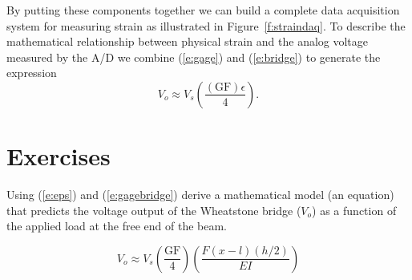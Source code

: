 By putting these components together we can build a complete data acquisition system for measuring strain as illustrated in Figure~\ref{f:straindaq}. To describe the mathematical relationship between physical strain and the analog voltage measured by the A/D we combine (\ref{e:gage}) and (\ref{e:bridge}) to generate the expression
\begin{equation} \label{e:gagebridge}
V_o \approx V_s\left( \frac{(\mathrm{GF})\epsilon}{4} \right).
\end{equation}

\section{Exercises}
\begin{ex}
Using (\ref{e:eps}) and (\ref{e:gagebridge}) derive a mathematical model (an equation) that predicts the voltage output of the Wheatstone bridge ($V_o$) as a function of the applied load at the free end of the beam.
\end{ex}
\ifsolutions
\begin{soln}
\[
V_o \approx V_s\left( \frac{\mathrm{GF}}{4} \right) \left(\frac{F(x-l)(h/2)}{EI}\right)
\]
\end{soln}
\fi
























